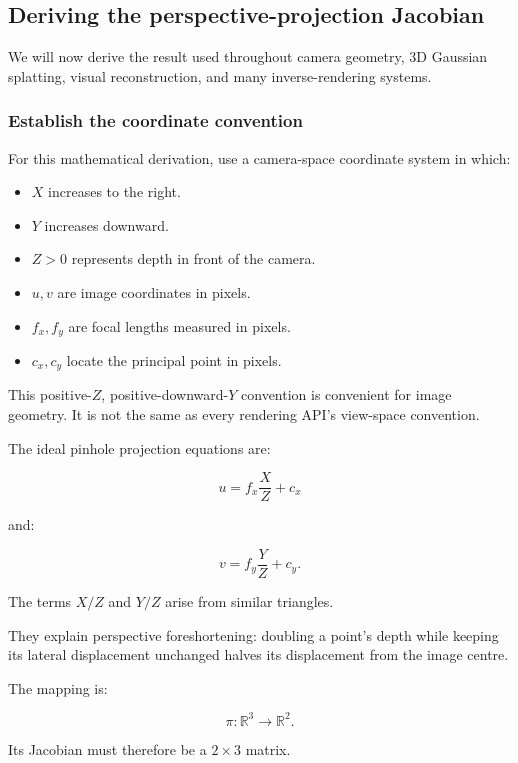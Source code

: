 \subsection{Deriving the perspective-projection Jacobian}\label{02-foundations-ii-ch021-deriving-the-perspective-projection-jacobian}

We will now derive the result used throughout camera geometry, 3D Gaussian splatting, visual reconstruction, and many inverse-rendering systems.

\subsubsection{Establish the coordinate convention}\label{02-foundations-ii-ch021-establish-the-coordinate-convention}

For this mathematical derivation, use a camera-space coordinate system in which:

\begin{itemize}
\tightlist
\item
  \(X\) increases to the right.
\item
  \(Y\) increases downward.
\item
  \(Z>0\) represents depth in front of the camera.
\item
  \(u,v\) are image coordinates in pixels.
\item
  \(f_x,f_y\) are focal lengths measured in pixels.
\item
  \(c_x,c_y\) locate the principal point in pixels.
\end{itemize}

This positive-\(Z\), positive-downward-\(Y\) convention is convenient for image geometry. It is not the same as every rendering API's view-space convention.

The ideal pinhole projection equations are:

\[
\boxed{ u=f_x\frac XZ+c_x }
\]

and:

\[
\boxed{ v=f_y\frac YZ+c_y }.
\]

The terms \(X/Z\) and \(Y/Z\) arise from similar triangles.

They explain perspective foreshortening: doubling a point's depth while keeping its lateral displacement unchanged halves its displacement from the image centre.

The mapping is:

\[
\pi:\mathbb R^3\rightarrow\mathbb R^2.
\]

Its Jacobian must therefore be a \(2\times3\) matrix.

